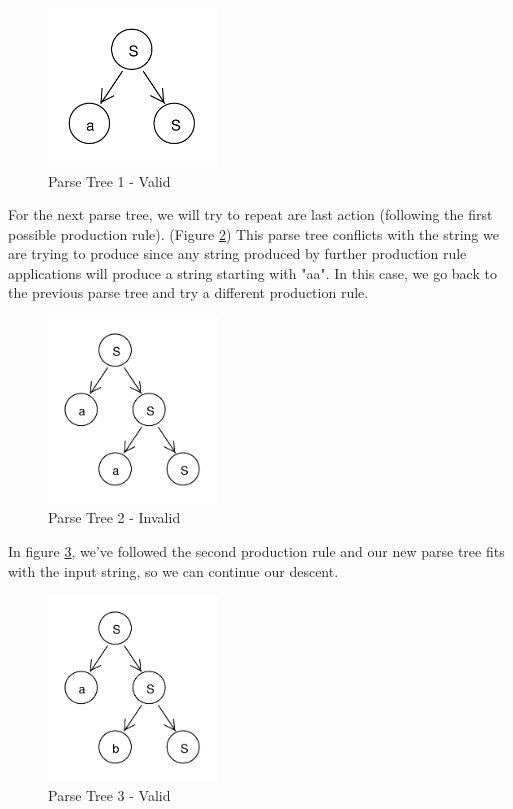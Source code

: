 \documentclass[11pt]{article}
\begin{document}
\begin{figure}[h!]
    \centering
    \includegraphics[width=0.4\textwidth,natwidth=30,natheight=30]{umlet/rdp_1.pdf}
    \caption{Parse Tree 1 - Valid}
    \label{fig:rdp_1}
\end{figure}

For the next parse tree, we will try to repeat are last action (following the first possible production rule).
(Figure \ref{fig:rdp_2}) This parse tree conflicts with the string we are trying to produce since any
string produced by further production rule applications will produce a string starting with "aa".
In this case, we go back to the previous parse tree and try a different production rule.

\begin{figure}[h!]
    \centering
    \includegraphics[width=0.4\textwidth,natwidth=30,natheight=30]{umlet/rdp_2.pdf}
    \caption{Parse Tree 2 - Invalid}
    \label{fig:rdp_2}
\end{figure}

In figure \ref{fig:rdp_3}, we've followed the second production rule
and our new parse tree fits with the input string, so we can continue our descent.

\begin{figure}[h!]
    \centering
    \includegraphics[width=0.4\textwidth,natwidth=30,natheight=30]{umlet/rdp_3.pdf}
    \caption{Parse Tree 3 - Valid}
    \label{fig:rdp_3}
\end{figure}
\end{document}
